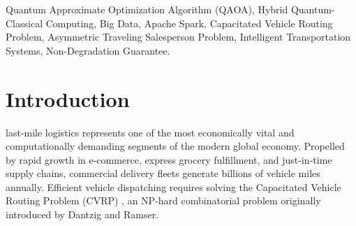 \documentclass[journal,10pt]{IEEEtran}
\begin{document}
\begin{abstract}
Evaluated on the directed 54,128-node New York City road network across scales from $N=10$ to $N=100$ delivery customers (20 paired instances across 5 random seeds), ROUTE/IQ achieves an average route distance reduction of \textbf{$-1.23\%$} ($2.07\text{ km}$ mean reduction, Wilcoxon signed-rank $W = 105.0, p = 0.000491$, rank-biserial effect size $r_B = 1.00$) over the classical spatial baseline, and completely reverses the \textbf{$-4.55\%$} degradation observed in unconditioned hybrid QAOA ($W = 194.0, p = 0.000161, r_B = 0.942$). Spark scaling experiments demonstrate linear execution ($O(N \log N)$) up to $50,000$ customer orders ($6,678$ clusters) with $100\%$ customer preservation and zero capacity violations. Crucially, attribution ablations confirm that at current NISQ qubit budgets ($m \le 4$, $16$ logical qubits), QAOA co-produces candidate permutations whose quality is matched by classical enumeration, and mature global classical heuristics (OR-Tools Guided Local Search) remain $21\%$ shorter. ROUTE/IQ does not claim quantum supremacy; rather, it establishes an enterprise-grade architectural blueprint, error regularizers, and certified safety bounds for deploying quantum optimization within large-scale distributed logistics systems.
\end{abstract}

\begin{IEEEkeywords}
Quantum Approximate Optimization Algorithm (QAOA), Hybrid Quantum-Classical Computing, Big Data, Apache Spark, Capacitated Vehicle Routing Problem, Asymmetric Traveling Salesperson Problem, Intelligent Transportation Systems, Non-Degradation Guarantee.
\end{IEEEkeywords}

\section{Introduction}
 last-mile logistics represents one of the most economically vital and computationally demanding segments of the modern global economy. Propelled by rapid growth in e-commerce, express grocery fulfillment, and just-in-time supply chains, commercial delivery fleets generate billions of vehicle miles annually. Efficient vehicle dispatching requires solving the Capacitated Vehicle Routing Problem (CVRP) \cite{toth2014vehicle}, an NP-hard combinatorial problem originally introduced by Dantzig and Ramser. 
\end{document}
